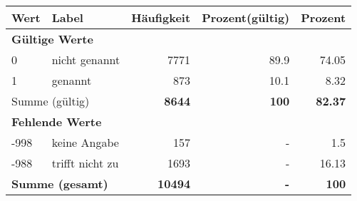      \begin{longtable}{lXrrr}
     \toprule
     \textbf{Wert} & \textbf{Label} & \textbf{Häufigkeit} & \textbf{Prozent(gültig)} & \textbf{Prozent} \\
     \endhead
     \midrule
     \multicolumn{5}{l}{\textbf{Gültige Werte}}\\

     0 &
     \multicolumn{1}{X}{ nicht genannt   } &


       \num{7771} &
       \num[round-mode=places,round-precision=2]{89.9} &
         \num[round-mode=places,round-precision=2]{74.05} \\

     1 &
     \multicolumn{1}{X}{ genannt   } &


       \num{873} &
       \num[round-mode=places,round-precision=2]{10.1} &
         \num[round-mode=places,round-precision=2]{8.32} \\
     \midrule
     \multicolumn{2}{l}{Summe (gültig)} &
       \textbf{\num{8644}} &
     \textbf{\num{100}} &
       \textbf{\num[round-mode=places,round-precision=2]{82.37}} \\
     \multicolumn{5}{l}{\textbf{Fehlende Werte}}\\
       -998 &
       keine Angabe &
         \num{157} &
        - &
         \num[round-mode=places,round-precision=2]{1.5} \\
       -988 &
       trifft nicht zu &
         \num{1693} &
        - &
         \num[round-mode=places,round-precision=2]{16.13} \\
     \midrule
     \multicolumn{2}{l}{\textbf{Summe (gesamt)}} &
          \textbf{\num{10494}} &
        \textbf{-} &
        \textbf{\num{100}} \\
     \bottomrule
     \end{longtable}
     
